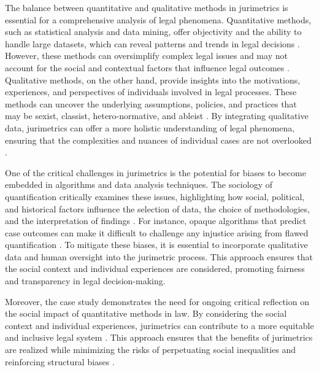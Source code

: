The balance between quantitative and qualitative methods in jurimetrics is essential for a comprehensive analysis of legal phenomena. Quantitative methods, such as statistical analysis and data mining, offer objectivity and the ability to handle large datasets, which can reveal patterns and trends in legal decisions \cite{10.1177/0094306118767649,de2010jurimetrics}. However, these methods can oversimplify complex legal issues and may not account for the social and contextual factors that influence legal outcomes \cite{10.1590/dados.2022.65.3.267,10.1057/s41599-020-0396-5}. Qualitative methods, on the other hand, provide insights into the motivations, experiences, and perspectives of individuals involved in legal processes. These methods can uncover the underlying assumptions, policies, and practices that may be sexist, classist, hetero-normative, and ableist \cite{10.1590/dados.2022.65.3.267,10.1057/s41599-020-0396-5}. By integrating qualitative data, jurimetrics can offer a more holistic understanding of legal phenomena, ensuring that the complexities and nuances of individual cases are not overlooked \cite{10.1590/dados.2022.65.3.267,10.1057/s41599-020-0396-5}.

One of the critical challenges in jurimetrics is the potential for biases to become embedded in algorithms and data analysis techniques. The sociology of quantification critically examines these issues, highlighting how social, political, and historical factors influence the selection of data, the choice of methodologies, and the interpretation of findings \cite{10.1590/dados.2022.65.3.267,10.1057/s41599-020-0396-5}. For instance, opaque algorithms that predict case outcomes can make it difficult to challenge any injustice arising from flawed quantification \cite{10.1590/dados.2022.65.3.267,10.1057/s41599-020-0396-5}. To mitigate these biases, it is essential to incorporate qualitative data and human oversight into the jurimetric process. This approach ensures that the social context and individual experiences are considered, promoting fairness and transparency in legal decision-making.

Moreover, the case study demonstrates the need for ongoing critical reflection on the social impact of quantitative methods in law. By considering the social context and individual experiences, jurimetrics can contribute to a more equitable and inclusive legal system \cite{10.1590/dados.2022.65.3.267,10.1057/s41599-020-0396-5}. This approach ensures that the benefits of jurimetrics are realized while minimizing the risks of perpetuating social inequalities and reinforcing structural biases \cite{10.1590/dados.2022.65.3.267,10.1057/s41599-020-0396-5}.

